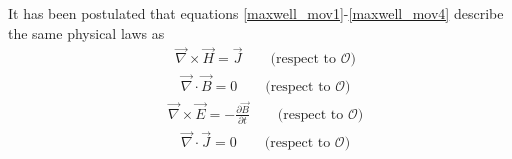 \documentclass[11pt,a4paper,oneside]{book}
\numberwithin{equation}{section}
\theoremstyle{it}
\theoremstyle{definition}
\begin{document}
It has been postulated that equations \ref{maxwell_mov1}-\ref{maxwell_mov4} 
describe the same physical laws as 
\begin{equation}\label{maxwell_fix1}
	\begin{aligned}
		&\vec{\nabla}\times\vec{H} = \vec{J}\qquad\text{(respect to 
		$\mathcal{O}$)}
	\end{aligned}
\end{equation} 
\begin{equation}\label{maxwell_fix2}
	\begin{aligned}
		&\vec{\nabla}\cdot\vec{B} = 0\qquad\text{(respect to $\mathcal{O}$)}
	\end{aligned}
\end{equation} 
\begin{equation}\label{maxwell_fix3}
	\begin{aligned}
		&\vec{\nabla}\times\vec{E} = -\frac{\partial\vec{B}}{\partial 
		t}\qquad\text{(respect to $\mathcal{O}$)}
	\end{aligned}
\end{equation} 
\begin{equation}\label{maxwell_fix4}
	\begin{aligned}
		&\vec{\nabla}\cdot\vec{J} = 0\qquad\text{(respect to $\mathcal{O}$)}
	\end{aligned}
\end{equation} 
\end{document}
